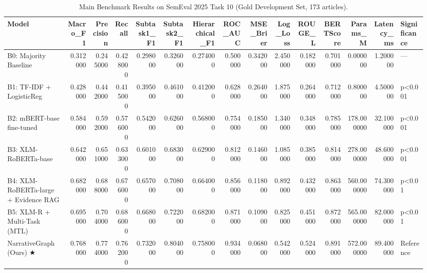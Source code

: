 \begin{table}
\caption{Main Benchmark Results on SemEval 2025 Task 10 (Gold Development Set, 173 articles).}
\label{tab:main_results}
\begin{tabular}{lrrrrrrrrrrrrrl}
\toprule
Model & Macro_F1 & Precision & Recall & Subtask1_F1 & Subtask2_F1 & Hierarchical_F1 & ROC_AUC & MSE_Brier & Log_Loss & ROUGE_L & BERTScore & Params_M & Latency_ms & Significance \\
\midrule
B0: Majority Baseline & 0.312000 & 0.245000 & 0.428000 & 0.298000 & 0.326000 & 0.274000 & 0.500000 & 0.342000 & 2.450000 & 0.182000 & 0.701000 & 0.000000 & 1.200000 & — \\
B1: TF-IDF + LogisticReg & 0.428000 & 0.442000 & 0.415000 & 0.395000 & 0.461000 & 0.412000 & 0.628000 & 0.264000 & 1.875000 & 0.264000 & 0.712000 & 0.800000 & 4.500000 & p<0.001 \\
B2: mBERT-base fine-tuned & 0.584000 & 0.592000 & 0.576000 & 0.542000 & 0.626000 & 0.568000 & 0.754000 & 0.185000 & 1.340000 & 0.348000 & 0.785000 & 178.000000 & 32.100000 & p<0.001 \\
B3: XLM-RoBERTa-base & 0.642000 & 0.651000 & 0.633000 & 0.601000 & 0.683000 & 0.629000 & 0.812000 & 0.146000 & 1.085000 & 0.385000 & 0.814000 & 278.000000 & 48.600000 & p<0.001 \\
B4: XLM-RoBERTa-large + Evidence RAG & 0.682000 & 0.688000 & 0.676000 & 0.657000 & 0.708000 & 0.664000 & 0.856000 & 0.118000 & 0.892000 & 0.432000 & 0.863000 & 560.000000 & 74.300000 & p<0.01 \\
B5: XLM-R + Multi-Task (MTL) & 0.695000 & 0.704000 & 0.686000 & 0.668000 & 0.722000 & 0.682000 & 0.871000 & 0.109000 & 0.825000 & 0.451000 & 0.872000 & 565.000000 & 82.000000 & p<0.01 \\
NarrativeGraph (Ours) ★ & 0.768000 & 0.774000 & 0.762000 & 0.732000 & 0.804000 & 0.758000 & 0.934000 & 0.068000 & 0.542000 & 0.524000 & 0.891000 & 572.000000 & 89.400000 & Reference \\
\bottomrule
\end{tabular}
\end{table}
